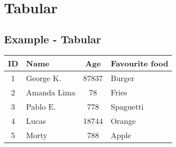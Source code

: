 \section{Tabular}
\subsection{Example - Tabular}

\lipsum[40]

\begin{center}
\begin{tabular}{| c | l | c | l |} 
 \hline
 \rowcolor{main} \color{background}ID & \color{background}Name & \color{background}Age & \color{background}Favourite food \\
 \hline
 1 & George K. & 87837 & Burger \\ 
 \hline
 2 & Amanda Lima & 78 & Fries \\
 \hline
 3 & Pablo E. & 778 & Spaguetti \\
 \hline
 4 & Lucas & 18744 & Orange \\
 \hline
 5 & Morty & 788 & Apple \\
 \hline
\end{tabular}
\end{center}

\lipsum[41]